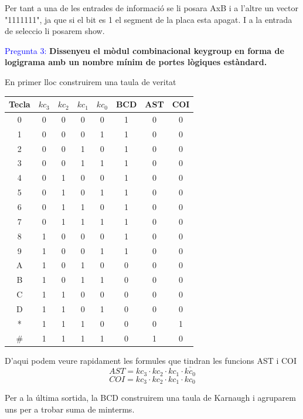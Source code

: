 \documentclass[12pt, a4papre]{article}
\begin{document}
	Per tant a una de les entrades de informació se li posara AxB i a l'altre un vector "1111111", ja que si el bit es 1 el segment de la placa esta apagat. I a la entrada de seleccio li posarem show.
	
	\textcolor{blue}{Pregunta 3:} \textbf{Dissenyeu el mòdul combinacional keygroup en forma de logigrama amb un nombre mínim de portes lògiques estàndard.}
	
	En primer lloc construirem una taula de veritat
	
	\begin{center}
	\begin{tabular}{||c| c c c c | c c c||} 
	 \hline
	 Tecla & $kc_3$ & $kc_2$ & $ kc_1 $ &$kc_0$ & BCD & AST & COI \\ [0.5ex] 
	 \hline\hline
	 0 & 0 & 0 & 0 & 0 & 1 & 0 & 0\\ 
	 \hline
	 1 & 0 & 0 & 0 & 1 & 1 & 0 & 0\\ 
	 \hline
	 2 & 0 & 0 & 1 & 0 & 1 & 0 & 0\\ 
	 \hline
	 3 & 0 & 0 & 1 & 1 & 1 & 0 & 0\\ 
	 \hline
	 4 & 0 & 1 & 0 & 0 & 1 & 0 & 0\\ 
	 \hline
	 5 & 0 & 1 & 0 & 1 & 1 & 0 & 0\\ 
	 \hline
	 6 & 0 & 1 & 1 & 0 & 1 & 0 & 0\\ 
	 \hline
	 7 & 0 & 1 & 1 & 1 & 1 & 0 & 0\\ 
	 \hline
	 8 & 1 & 0 & 0 & 0 & 1 & 0 & 0\\ 
	 \hline
	 9 & 1 & 0 & 0 & 1 & 1 & 0 & 0\\ 
	 \hline
	 A & 1 & 0 & 1 & 0 & 0 & 0 & 0\\ 
	 \hline
	 B & 1 & 0 & 1 & 1 & 0 & 0 & 0\\ 
	 \hline
	 C & 1 & 1 & 0 & 0 & 0 & 0 & 0\\ 
	 \hline
	 D & 1 & 1 & 0 & 1 & 0 & 0 & 0\\ 
	 \hline
	 * & 1 & 1 & 1 & 0 & 0 & 0 & 1\\ 
	 \hline
	 \# & 1 & 1 & 1 & 1 & 0 & 1 & 0\\ 
	  \hline\hline
	\end{tabular}
	\end{center}
	
	D'aqui podem veure rapidament les formules que tindran les funcions AST i COI
	\[AST = kc_3\cdot kc_2\cdot kc_1 \cdot \bar{kc_0}\]
	\[COI = kc_3\cdot kc_2\cdot kc_1 \cdot kc_0\]
	
	Per a la última sortida, la BCD construirem una taula de Karnaugh i agruparem uns per a trobar suma de minterms.
	
\end{document}
